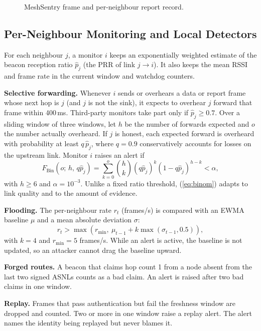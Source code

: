 \documentclass[conference]{IEEEtran}
\begin{document}
\begin{figure}[t]
\centering

\caption{MeshSentry frame and per-neighbour report record.}
\label{fig:frame}
\end{figure}

\subsection{Per-Neighbour Monitoring and Local Detectors}
For each neighbour $j$, a monitor $i$ keeps an exponentially weighted
estimate of the beacon reception ratio $\hat p_{j}$ (the PRR of link
$j\!\to\!i$). It also keeps the mean RSSI and frame rate in the current window
and watchdog counters.

\textbf{Selective forwarding.} Whenever $i$ sends or overhears a data or
report frame whose next hop is $j$ (and $j$ is not the sink), it expects to
overhear $j$ forward that frame within 400\,ms. Third-party monitors take part
only if $\hat p_j \ge 0.7$. Over a sliding window of three windows, let
$h$ be the number of forwards expected and $o$ the number actually overheard.
If $j$ is honest, each expected forward is overheard with probability at
least $q\,\hat p_j$, where $q=0.9$ conservatively accounts for losses on the
upstream link. Monitor $i$ raises an alert if
\begin{equation}
F_{\mathrm{Bin}}\!\left(o;\,h,\,q\hat p_j\right)=\sum_{k=0}^{o}\binom{h}{k}(q\hat p_j)^k(1-q\hat p_j)^{h-k} < \alpha ,
\label{eq:binom}
\end{equation}
with $h\ge 6$ and $\alpha=10^{-3}$. Unlike a fixed ratio threshold,
(\ref{eq:binom}) adapts to link quality and to the amount of evidence.

\textbf{Flooding.} The per-neighbour rate $r_t$ (frames/s) is compared with
an EWMA baseline $\mu$ and a mean absolute deviation $\sigma$:
\begin{equation}
r_t > \max\!\left(r_{\min},\ \mu_{t-1} + k\max(\sigma_{t-1},0.5)\right),
\end{equation}
with $k=4$ and $r_{\min}=5$ frames/s. While an alert is active, the baseline
is not updated, so an attacker cannot drag the baseline upward.

\textbf{Forged routes.} A beacon that claims hop count 1 from a node absent
from the last two signed ASNLs counts as a bad claim. An alert is raised after
two bad claims in one window.

\textbf{Replay.} Frames that pass authentication but fail the freshness
window are dropped and counted. Two or more in one window raise a replay
alert. The alert names the identity being replayed but never blames it.
\end{document}
